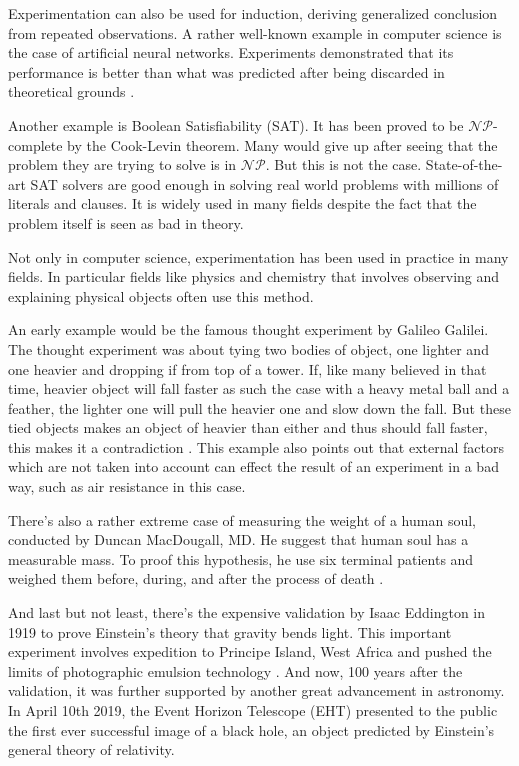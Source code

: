 Experimentation can also be used for induction, deriving generalized conclusion from repeated observations.
A rather well-known example in computer science is the case of artificial neural networks.
Experiments demonstrated that its performance is better than what was predicted after being discarded in theoretical grounds \citep{tichyShouldComputerScientists1998}.

Another example is Boolean Satisfiability (SAT).
It has been proved to be $\mathcal{NP}$-complete by the Cook-Levin theorem.
Many would give up after seeing that the problem they are trying to solve is in $\mathcal{NP}$.
But this is not the case.
State-of-the-art SAT solvers are good enough in solving real world problems with millions of literals and clauses.
It is widely used in many fields despite the fact that the problem itself is seen as bad in theory.

Not only in computer science, experimentation has been used in practice in many fields.
In particular fields like physics and chemistry that involves observing and explaining physical objects often use this method.

An early example would be the famous thought experiment by Galileo Galilei.
The thought experiment was about tying two bodies of object, one lighter and one heavier and dropping if from top of a tower.
If, like many believed in that time, heavier object will fall faster as such the case with a heavy metal ball and a feather, the lighter one will pull the heavier one and slow down the fall.
But these tied objects makes an object of heavier than either and thus should fall faster, this makes it a contradiction \citep{goodmanWhatDoesResearch2016}. This example also points out that external factors which are not taken into account can effect the result of an experiment in a bad way, such as air resistance in this case.

There's also a rather extreme case of measuring the weight of a human soul, conducted by Duncan MacDougall, MD. He suggest that human soul has a measurable mass. To proof this hypothesis, he use six terminal patients and weighed them before, during, and after the process of death \citep{ryanModernExperimentalDesign2007a}.

And last but not least, there's the expensive validation by Isaac Eddington in 1919 to prove Einstein's theory that gravity bends light.
This important experiment involves expedition to Principe Island, West Africa and pushed the limits of photographic emulsion technology \citep{tichyShouldComputerScientists1998}.
And now, 100 years after the validation, it was further supported by another great advancement in astronomy.
In April 10th 2019, the Event Horizon Telescope (EHT) presented to the public the first ever successful image of a black hole, an object predicted by Einstein's general theory of relativity.

